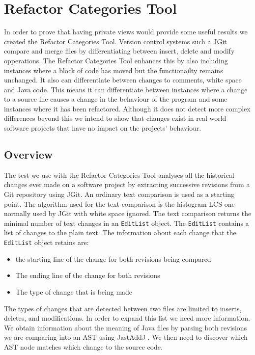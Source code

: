 
\chapter{Refactor Categories Tool}
In order to prove that having private views would provide some useful results we created the Refactor Categories Tool. Version control systems such a JGit compare and merge files  by differentiating between insert, delete and modify  opperations. The Refactor Categories Tool enhances this by also including instances where a block of code has moved but the functionailty remains unchanged. It also can differentiate between changes to comments, white space and Java code. This means it can differentiate between instances where a change to a source file causes a change in the behaviour of the program and some instances where it has been refactored.  Although it does not detect more complex differences beyond this we intend to show that changes exist in real world software projects that have no impact on the projects' behaviour.



\section{Overview}
The test we use with the Refactor Categories Tool analyses all the historical changes ever made on a software project by extracting successive revisions from a Git repository using JGit.
An ordinary text comparison is used as a starting point.  The algorithm used for the text comparison is the histogram LCS one normally used by JGit with white space ignored. The text comparison returns the minimal number of text changes in an \lstinline{EditList} object.  The \lstinline{EditList} contains a list of changes to the plain text. The information about each change that the \lstinline{EditList} object retains are:

\begin{itemize}
  \item the starting line of the change for both revisions being compared
  \item The ending line of the change for both revisions 
  \item The type of change that is being made
\end{itemize}

The types of changes that are detected between two files are limited to inserts, deletes, and modifications. In order to expand this list we need more information.  We obtain information about the meaning of Java files by parsing both revisions we are comparing into an AST using JastAddJ \cite{Oqvist2013}. We then need to discover which AST node matches which change to the source code. 

